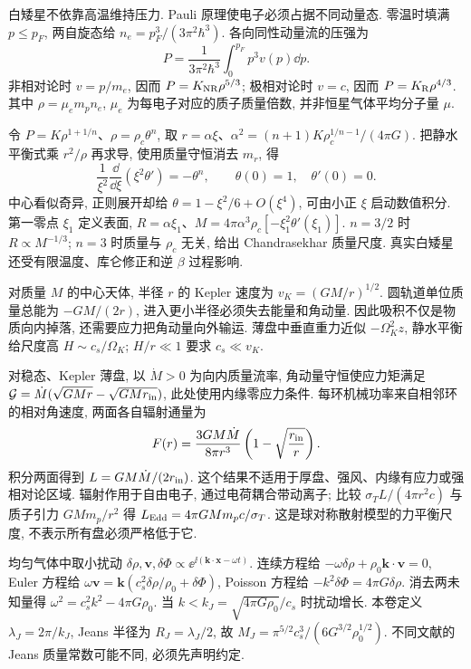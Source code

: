 \label{ch:compact}
白矮星不依靠高温维持压力. Pauli 原理使电子必须占据不同动量态. 零温时填满 $p\le p_F$, 两自旋态给 $n_e=p_F^3/(3\pi^2\hbar^3)$. 各向同性动量流的压强为
\begin{equation}
P=\frac1{3\pi^2\hbar^3}\int_0^{p_F}p^3v(p)\dd p.
\end{equation}
非相对论时 $v=p/m_e$, 因而 $P=K_{\rm NR}\rho^{5/3}$; 极相对论时 $v=c$, 因而 $P=K_{\rm R}\rho^{4/3}$. 其中 $\rho=\mu_em_pn_e$, $\mu_e$ 为每电子对应的质子质量倍数, 并非恒星气体平均分子量 $\mu$.

令 $P=K\rho^{1+1/n}$、$\rho=\rho_c\theta^n$, 取
$r=\alpha\xi$、$\alpha^2=(n+1)K\rho_c^{1/n-1}/(4\pi G)$.
把静水平衡式乘 $r^2/\rho$ 再求导, 使用质量守恒消去 $m_r$, 得
\begin{equation}\label{eq:lane}
\frac1{\xi^2}\frac{\dd}{\dd\xi}\left(\xi^2\theta'\right)=-\theta^n,
\qquad\theta(0)=1,\quad\theta'(0)=0.
\end{equation}
中心看似奇异, 正则展开却给 $\theta=1-\xi^2/6+O(\xi^4)$, 可由小正 $\xi$ 启动数值积分. 第一零点 $\xi_1$ 定义表面, $R=\alpha\xi_1$、$M=4\pi\alpha^3\rho_c[-\xi_1^2\theta'(\xi_1)]$. $n=3/2$ 时 $R\propto M^{-1/3}$; $n=3$ 时质量与 $\rho_c$ 无关, 给出 Chandrasekhar 质量尺度. 真实白矮星还受有限温度、库仑修正和逆 $\beta$ 过程影响.

对质量 $M$ 的中心天体, 半径 $r$ 的 Kepler 速度为 $v_K=(GM/r)^{1/2}$. 圆轨道单位质量总能为 $-GM/(2r)$, 进入更小半径必须失去能量和角动量. 因此吸积不仅是物质向内掉落, 还需要应力把角动量向外输运. 薄盘中垂直重力近似 $-\Omega_K^2z$, 静水平衡给尺度高 $H\sim c_s/\Omega_K$; $H/r\ll1$ 要求 $c_s\ll v_K$.

对稳态、Kepler 薄盘, 以 $\dot M>0$ 为向内质量流率, 角动量守恒使应力矩满足 $\mathcal G=\dot M(\sqrt{GMr}-\sqrt{GMr_{\rm in}})$, 此处使用内缘零应力条件. 每环机械功率来自相邻环的相对角速度, 两面各自辐射通量为
\begin{equation}
F(r)=\frac{3GM\dot M}{8\pi r^3}\left(1-\sqrt{\frac{r_{\rm in}}r}\right).
\end{equation}
积分两面得到 $L=GM\dot M/(2r_{\rm in})$. 这个结果不适用于厚盘、强风、内缘有应力或强相对论区域. 辐射作用于自由电子, 通过电荷耦合带动离子; 比较 $\sigma_TL/(4\pi r^2c)$ 与质子引力 $GMm_p/r^2$ 得 $L_{\rm Edd}=4\pi GMm_pc/\sigma_T$. 这是球对称散射模型的力平衡尺度, 不表示所有盘必须严格低于它.

均匀气体中取小扰动 $\delta\rho,\boldsymbol v,\delta\Phi\propto\ee^{\ii(\boldsymbol k\cdot\boldsymbol x-\omega t)}$. 连续方程给 $-\omega\delta\rho+\rho_0\boldsymbol k\cdot\boldsymbol v=0$, Euler 方程给 $\omega\boldsymbol v=\boldsymbol k(c_s^2\delta\rho/\rho_0+\delta\Phi)$, Poisson 方程给 $-k^2\delta\Phi=4\pi G\delta\rho$. 消去两未知量得 $\omega^2=c_s^2k^2-4\pi G\rho_0$. 当 $k<k_J=\sqrt{4\pi G\rho_0}/c_s$ 时扰动增长. 本卷定义 $\lambda_J=2\pi/k_J$, Jeans 半径为 $R_J=\lambda_J/2$, 故 $M_J=\pi^{5/2}c_s^3/(6G^{3/2}\rho_0^{1/2})$. 不同文献的 Jeans 质量常数可能不同, 必须先声明约定.


